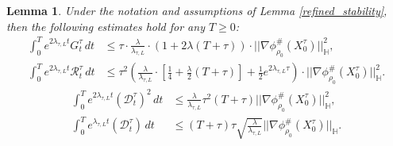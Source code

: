 \documentclass[11pt,a4paper]{amsart}
\newcommand{\1}{\mathds{1}}
\newtheorem{lemma}[theorem]{\textbf{Lemma}}
\numberwithin{equation}{section}
\begin{document}
\begin{lemma}
Under the notation and assumptions of Lemma \ref{refined_stability}, then the following estimates hold for any $T \geq 0$:
\[
\begin{aligned}
    \int_0^T e^{2\lambda_{\tau,L} t} G^{\tau}_t \, dt 
    &\leq \tau \cdot \frac{\lambda}{\lambda_{\tau,L}} \cdot(1+2\lambda(T+\tau)) \cdot ||\nabla \phi^{\#}_{\rho_0}(X_0^{\tau})||^2_{\mathbb{H}} , \\
    \int_0^T e^{2\lambda_{\tau,L} t} \mathcal{R}^{\tau}_t \, dt 
    &\leq \tau^2 \left( \frac{\lambda}{\lambda_{\tau,L}} \cdot \left[ \frac{1}{4} + \frac{\lambda}{2} (T+\tau) \right]+ \frac{1}{2} e^{2 \lambda_{\tau, L} \tau} \right) \cdot ||\nabla \phi^{\#}_{\rho_0}(X_0^{\tau})||^2_{\mathbb{H}}.
\end{aligned}
\]
\[
\begin{aligned}
    \int_0^T e^{2\lambda_{\tau,L} t} (\mathcal{D}_t^{\tau})^2 \, dt 
    &\leq \frac{\lambda}{\lambda_{\tau,L}} \tau^2(T+\tau) ||\nabla \phi^{\#}_{\rho_0}(X_0^{\tau})||^2_{\mathbb{H}}, \\
    \int_0^T e^{\lambda_{\tau,L} t} (\mathcal{D}_t^{\tau}) \, dt 
    &\leq (T+\tau) \tau \sqrt{\frac{\lambda}{\lambda_{\tau,L}} } ||\nabla \phi^{\#}_{\rho_0}(X_0^{\tau})||_{\mathbb{H}}.
\end{aligned}
\]

\label{error_term_bounds}
\end{lemma}
\end{document}
